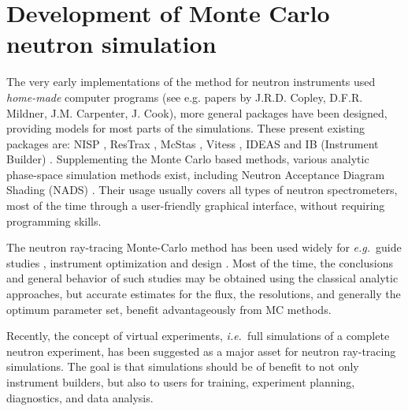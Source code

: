\section{Development of Monte Carlo neutron simulation}
The very early implementations of the method for neutron instruments used \emph{home-made} computer programs  (see e.g. papers by J.R.D. Copley, D.F.R. Mildner, J.M. Carpenter, J. Cook), more general packages have been designed, providing models for most parts of the simulations.
These present existing packages are: NISP \cite{NISP}, ResTrax
\cite{Restrax}, McStas\cite{mcs_ppf,nn_10_20,mcstas_pb,mcstas_2_jnr,mcstas_webpage}
, Vitess \cite{Vitess,vitess_webpage}, IDEAS \cite{IDEAS} and IB (Instrument
Builder) \cite{IB_webpage}. Supplementing the Monte Carlo based
methods, various analytic phase-space simulation methods exist,
including Neutron Acceptance Diagram Shading (NADS) \cite{NADS_webpage}.
Their usage usually covers all types of neutron spectrometers, most of the time through a user-friendly graphical interface, without requiring programming skills.

The neutron ray-tracing Monte-Carlo method has been used widely for
{\em e.g.}\ guide studies \cite{Copley93,Farhi02,Schanzer04},
instrument optimization and design \cite{Zsigmond04,Lieutenant05}.
Most of the time, the conclusions and general behavior of such studies
may be obtained using the classical analytic approaches,
but accurate estimates for the flux, the resolutions,
and generally the optimum parameter set, benefit advantageously from MC methods.

Recently, the concept of virtual experiments, {\em i.e.}\ full simulations
of a complete neutron experiment, has been suggested as a major asset for neutron ray-tracing simulations. The goal is that
simulations should be of benefit to not only instrument builders, but also
to users for training, experiment planning, diagnostics, and data
analysis.

